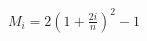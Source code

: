 \documentclass[preview]{standalone}
\begin{document}
\begin{align*}
M_i = 2\left(1 + \frac{2i}{n}\right)^2 - 1
\end{align*}
\end{document}
